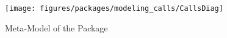 %
%

\begin{figure}[htb]
  \centering
  \texttt{[image: figures/packages/modeling\_calls/CallsDiag]}
  \caption{Meta-Model of the  Package}
  \label{fig:MM:calls}
\end{figure}
